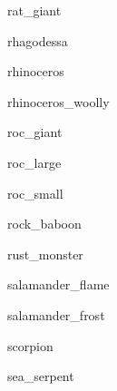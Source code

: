 \documentclass[letterpaper,serif]{module}
\begin{document}
\begin{newmonster}{rat_giant}\end{newmonster}

\begin{newmonster}{rhagodessa}\end{newmonster}

\begin{newmonster}{rhinoceros}\end{newmonster}

\begin{newmonster}{rhinoceros_woolly}\end{newmonster}

\begin{newmonster}{roc_giant}\end{newmonster}

\begin{newmonster}{roc_large}\end{newmonster}

\begin{newmonster}{roc_small}\end{newmonster}

\begin{newmonster}{rock_baboon}\end{newmonster}

\begin{newmonster}{rust_monster}\end{newmonster}

\begin{newmonster}{salamander_flame}\end{newmonster}

\begin{newmonster}{salamander_frost}\end{newmonster}

\begin{newmonster}{scorpion}\end{newmonster}

\begin{newmonster}{sea_serpent}\end{newmonster}
\end{document}
